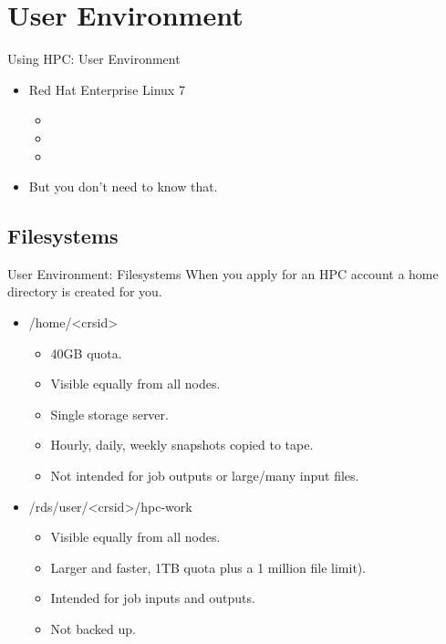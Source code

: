 \section{User Environment}
\begin{frame}{Using HPC: User Environment}
\begin{itemize}
\item<1,3->{\alert<1>{{Red Hat Enterprise Linux 7}}}
\begin{itemize}
\item{}
\item{}
\item{}
\end{itemize}
\item<2->{But you don't need to know that.}
\end{itemize}
\end{frame}

\subsection{Filesystems}
\begin{frame}{User Environment: Filesystems}
When you apply for an HPC account a home directory is created for you. 
\begin{itemize}
\item{\alert{/home/<crsid>}}
\begin{itemize}
\item{40GB quota.}
\item{Visible equally from all nodes.}
\item{Single storage server.}
\item{Hourly, daily, weekly snapshots copied to tape.}
\item{Not intended for job outputs or large/many input files.}
\end{itemize}
\item{\alert{/rds/user/<crsid>/hpc-work}}
\begin{itemize}
\item{Visible equally from all nodes.}
\item{Larger and faster, 1TB quota plus a 1 million file limit).}
\item{Intended for job inputs and outputs.}
\item{{\color{red}Not backed up.}}
 \pause
\end{itemize}
\end{itemize}
\end{frame}

